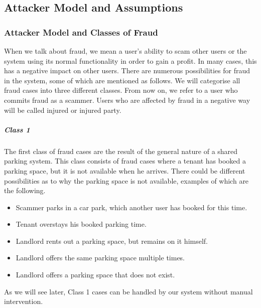 \documentclass[
a4paper,     %
titlepage,   %
14pt         %
]{scrartcl}  %
\theoremstyle{mystyle}
\begin{document}
\subsection{Attacker Model and Assumptions}

\subsubsection{Attacker Model and Classes of Fraud}
When we talk about fraud, we mean a user's ability to scam other users or the system using its normal functionality in order to gain a profit. In many cases, this has a negative impact on other users. There are numerous possibilities for fraud in the system, some of which are mentioned as follows. We will categorise all fraud cases into three different classes. From now on, we refer to a user who commits fraud as a scammer. Users who are affected by fraud in a negative way will be called injured or injured party. \\

\subparagraph{Class 1} The first class of fraud cases are the result of the general nature of a shared parking system. This class consists of fraud cases where a tenant has booked a parking space, but it is not available when he arrives. There could be different possibilities as to why the parking space is not available, examples of which are the following.
\begin{itemize}
\item Scammer parks in a car park, which another user has booked for this time.
\item Tenant overstays his booked parking time.
\item Landlord rents out a parking space, but remains on it himself.
\item Landlord offers the same parking space multiple times.
\item Landlord offers a parking space that does not exist.
\end{itemize}
As we will see later, Class 1 cases can be handled by our system without manual intervention. 
\end{document}
